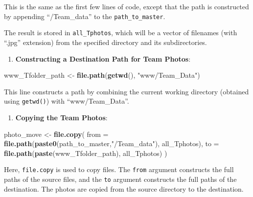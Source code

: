 \documentclass[
]{book}
\newenvironment{Shaded}{\begin{snugshade}}{\end{snugshade}}
\newcommand{\AttributeTok}[1]{\textcolor[rgb]{0.13,0.29,0.53}{#1}}
\newcommand{\FunctionTok}[1]{\textcolor[rgb]{0.13,0.29,0.53}{\textbf{#1}}}
\newcommand{\NormalTok}[1]{#1}
\newcommand{\OtherTok}[1]{\textcolor[rgb]{0.56,0.35,0.01}{#1}}
\newcommand{\StringTok}[1]{\textcolor[rgb]{0.31,0.60,0.02}{#1}}
\providecommand{\tightlist}{%
  \setlength{\itemsep}{0pt}\setlength{\parskip}{0pt}}
\begin{document}
This is the same as the first few lines of code, except that the path is constructed by appending ``/Team\_data'' to the \texttt{path\_to\_master}.

The result is stored in \texttt{all\_Tphotos}, which will be a vector of filenames (with ``.jpg'' extension) from the specified directory and its subdirectories.

\begin{enumerate}
\def\labelenumi{\arabic{enumi}.}
\setcounter{enumi}{1}
\tightlist
\item
  \textbf{Constructing a Destination Path for Team Photos}:
\end{enumerate}

\begin{Shaded}
\begin{Highlighting}[]
\NormalTok{   www\_Tfolder\_path }\OtherTok{\textless{}{-}} \FunctionTok{file.path}\NormalTok{(}\FunctionTok{getwd}\NormalTok{(), }\StringTok{"www/Team\_Data"}\NormalTok{)}
\end{Highlighting}
\end{Shaded}

This line constructs a path by combining the current working directory (obtained using \texttt{getwd()}) with ``www/Team\_Data''.

\begin{enumerate}
\def\labelenumi{\arabic{enumi}.}
\setcounter{enumi}{2}
\tightlist
\item
  \textbf{Copying the Team Photos}:
\end{enumerate}

\begin{Shaded}
\begin{Highlighting}[]
\NormalTok{   photo\_move }\OtherTok{\textless{}{-}} \FunctionTok{file.copy}\NormalTok{(}
     \AttributeTok{from =} \FunctionTok{file.path}\NormalTok{(}\FunctionTok{paste0}\NormalTok{(path\_to\_master,}\StringTok{"/Team\_data"}\NormalTok{), all\_Tphotos),}
     \AttributeTok{to =} \FunctionTok{file.path}\NormalTok{(}\FunctionTok{paste}\NormalTok{(www\_Tfolder\_path), all\_Tphotos)}
\NormalTok{   )}
\end{Highlighting}
\end{Shaded}

Here, \texttt{file.copy} is used to copy files. The \texttt{from} argument constructs the full paths of the source files, and the \texttt{to} argument constructs the full paths of the destination. The photos are copied from the source directory to the destination.
\end{document}
